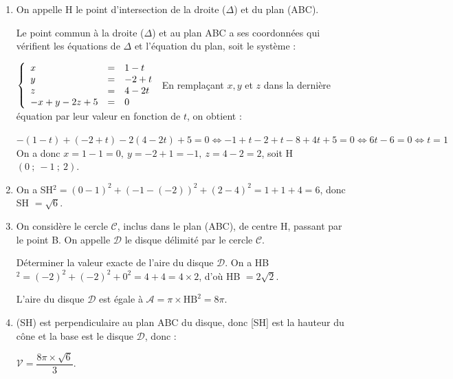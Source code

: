 \begin{enumerate}
La droite ($\Delta$) orthogonale au plan ABC a un vecteur directeur colinéaire au vecteur $\vect{n}$.

Donc $M(x~;~y~;~z) \in (\Delta) \iff \vect{\text{S}M} = t\vect{n}$, avec $t \in \R$, ce qui se traduit par les équations paramétriques:

$\left\{\begin{array}{l c l}
x - 1&=&- t\\
y - (- 2)&=&1t\\
z -4&=&-2t
\end{array}\right.\iff \left\{\begin{array}{l c l}
x &=&1 - t\\
y &=& -2 + t\\
z &=&4 -2t
\end{array}\right.$\quad $t \in \R \iff M(x~;~y~;~z) \in (\Delta) $.
\item On appelle H le point d'intersection de la droite ($\Delta$) et du plan (ABC).


Le point commun à la droite ($\Delta$) et au plan ABC a ses coordonnées qui vérifient les équations de $\Delta$ et l'équation du plan, soit le système :

$\left\{\begin{array}{l c l} 
x &=&1 - t\\
y &=& -2 + t\\
z &=&4 -2t\\
-x + y - 2z + 5 &=& 0
\end{array}\right.$ En remplaçant $x, y$ et $z$ dans la dernière équation par leur valeur en fonction de $t$, on obtient :

$- (1 - t) + (-2 + t) - 2(4 - 2t) + 5 = 0 \iff - 1 + t - 2 + t - 8 + 4t + 5 = 0 \iff 6t - 6 = 0 
\iff t = 1$
On a donc $x = 1 - 1 = 0, \: y = - 2 + 1 = - 1, \: z = 4 - 2 = 2$, soit H$(0~;~- 1~;~2)$.

\item 
On a SH$^2 = (0 - 1)^2 + (- 1 - (-2))^2 + (2 - 4)^2 = 1 + 1 + 4 = 6$, donc SH $= \sqrt{6}$.
\item On considère le cercle $\mathcal{C}$, inclus dans le plan (ABC), de centre H, passant par le
point B. On appelle $\mathcal{D}$ le disque délimité par le cercle $\mathcal{C}$.

Déterminer la valeur exacte de l'aire du disque $\mathcal{D}$.
On a HB$^2 = (- 2)^2 + (- 2)^2 + 0^2 = 4 + 4 = 4 \times 2$, d'où HB $= 2\sqrt 2$.

L'aire du disque $\mathcal{D}$ est égale à $\mathcal{A}  = \pi \times \text{HB}^2 = 8\pi$.
\item 

(SH) est perpendiculaire au plan ABC du disque, donc [SH] est la hauteur du cône et la base est le disque $\mathcal{D}$, donc :

$\mathcal{V} = \dfrac{8\pi \times \sqrt{6}}{3}$.
\end{enumerate}

\medskip
